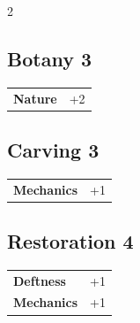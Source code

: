 \begin{multicols}{2}
\begin{tcolorbox}

\end{tcolorbox}

\begin{tcolorbox}
    \subsection*{Botany \hfill \small{3 }}
    \tcblower




\begin{tabular}{@{}ll@{}}
    \textbf{Nature} & +2\\
\end{tabular}


\end{tcolorbox}

\begin{tcolorbox}
    \subsection*{Carving \hfill \small{3 }}
    \tcblower




\begin{tabular}{@{}ll@{}}
    \textbf{Mechanics} & +1\\
\end{tabular}


\end{tcolorbox}

\begin{tcolorbox}
    \subsection*{Restoration \hfill \small{4 }}
    \tcblower




\begin{tabular}{@{}ll@{}}
    \textbf{Deftness} & +1\\
    \textbf{Mechanics} & +1\\
\end{tabular}


\end{tcolorbox}
\end{multicols}
